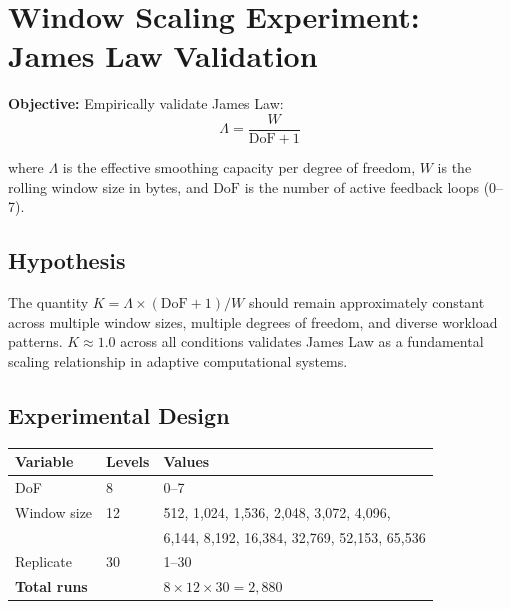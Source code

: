 
\section{Window Scaling Experiment: James Law Validation}

\textbf{Objective:} Empirically validate James Law:
\[
  \Lambda = \frac{W}{\mathrm{DoF} + 1}
\]

where $\Lambda$ is the effective smoothing capacity per degree of freedom,
$W$ is the rolling window size in bytes, and $\mathrm{DoF}$ is the number
of active feedback loops (0--7).


\subsection{Hypothesis}

The quantity $K = \Lambda \times (\mathrm{DoF}+1) / W$ should remain
approximately constant across multiple window sizes, multiple degrees of
freedom, and diverse workload patterns. $K \approx 1.0$ across all
conditions validates James Law as a fundamental scaling relationship in
adaptive computational systems.

\subsection{Experimental Design}

\begin{center}
\begin{tabular}{lll}
\toprule
Variable     & Levels & Values \\
\midrule
DoF          & 8  & 0--7 \\
Window size  & 12 & 512, 1{,}024, 1{,}536, 2{,}048, 3{,}072, 4{,}096, \\
             &    & 6{,}144, 8{,}192, 16{,}384, 32{,}769, 52{,}153, 65{,}536 \\
Replicate    & 30 & 1--30 \\
\midrule
\textbf{Total runs} & & $8 \times 12 \times 30 = 2{,}880$ \\
\bottomrule
\end{tabular}
\end{center}

